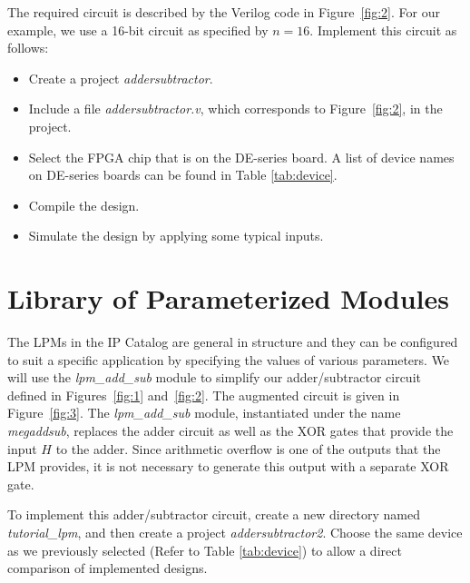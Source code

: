 \documentclass[11pt, twoside, pdftex]{article}
\begin{document}
 
The required circuit is described by the Verilog code in Figure~\ref{fig:2}.
For our example, we use a 16-bit circuit as specified by $n = 16$.
Implement this circuit as follows:
\begin{itemize}
\item Create a project {\it addersubtractor}.
\item Include a file {\it addersubtractor.v}, which corresponds to Figure~\ref{fig:2},
in the project. 
\item Select the FPGA chip that is on the DE-series board. A list of device names on DE-series boards can be found in Table \ref{tab:device}.
\item Compile the design.
\item Simulate the design by applying some typical inputs.
\end{itemize}

\newpage

\newpage

\section{Library of Parameterized Modules}

The LPMs in the IP Catalog are general in structure 
and they can be configured to suit a specific
application by specifying the values of various parameters.
We will use the {\it lpm\_add\_sub} module to simplify our 
adder/subtractor circuit defined in Figures~\ref{fig:1} and~\ref{fig:2}.
The augmented circuit is given in Figure~\ref{fig:3}. The {\it lpm\_add\_sub} module,
instantiated under the name {\it megaddsub},
replaces the adder circuit as well as the XOR gates that provide the input $H$
to the adder. Since arithmetic overflow is one of the outputs that the LPM
provides, it is not necessary to generate this output with a separate XOR gate.

To implement this adder/subtractor circuit, create a new directory named
{\it tutorial\_lpm}, and then create a project {\it addersubtractor2}.
Choose the same device as we previously selected (Refer to Table \ref{tab:device}) 
to allow a direct comparison of implemented designs.
\end{document}
